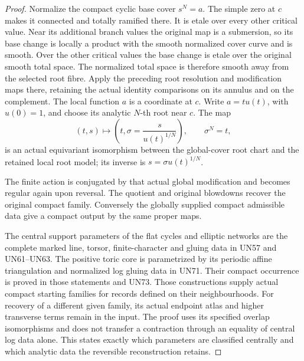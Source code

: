 \begin{proof}
Normalize the compact cyclic base cover
\(s^N=a\). The simple zero at \(c\)
makes it connected and totally ramified
there. It is etale over every other
critical value. Near its additional
branch values the original map is a
submersion, so its base change is locally
a product with the smooth normalized
cover curve and is smooth. Over the
other critical values the base change
is etale over the original smooth total
space. The normalized total space is
therefore smooth away from the selected
root fibre. Apply the preceding root
resolution and modification maps there,
retaining the actual identity comparisons
on its annulus and on the complement.
The local function \(a\) is a coordinate
at \(c\). Write \(a=t u(t)\), with
\(u(0)=1\), and choose its analytic
\(N\)-th root near \(c\). The map
\[
 (t,s)\longmapsto
 \left(t,\sigma=\frac{s}{u(t)^{1/N}}\right),
 \qquad \sigma^N=t,
\]
is an actual equivariant isomorphism
between the global-cover root chart
and the retained local root model;
its inverse is \(s=\sigma u(t)^{1/N}\).

The finite action is conjugated by that
actual global modification and becomes
regular again upon reversal. The quotient
and original blowdowns recover the
original compact family. Conversely the
globally supplied compact admissible
data give a compact output by the same
proper maps.

The central support parameters of the
flat cycles and elliptic networks are
the complete marked line, torsor,
finite-character and gluing data in
UN57 and UN61--UN63. The positive
toric core is parametrized by its
periodic affine triangulation and
normalized log gluing data in UN71.
Their compact occurrence is proved
in those statements and UN73.
Those constructions supply actual
compact starting families for records
defined on their neighbourhoods.
For recovery of a different given
family, its actual endpoint atlas
and higher transverse terms remain
in the input. The proof uses its
specified overlap isomorphisms and
does not transfer a contraction
through an equality of central log
data alone. This states exactly
which parameters are classified
centrally and which analytic data
the reversible reconstruction retains.
\end{proof}
